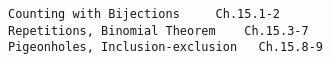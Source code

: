 \documentclass[handout]{mcs}
\begin{document}
\renewcommand{\reading}{
\begin{itemize}
\item Chapter 15{.\ \emph{Cardinality Rules}}

 \end{itemize}}


\begin{staffnotes}
\begin{verbatim}
Counting with Bijections     Ch.15.1-2
Repetitions, Binomial Theorem    Ch.15.3-7
Pigeonholes, Inclusion-exclusion   Ch.15.8-9              
\end{verbatim}
\end{staffnotes}





\end{document}
